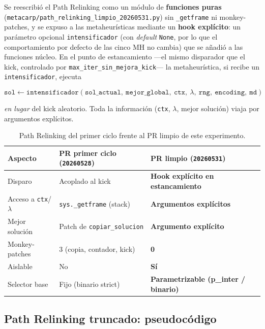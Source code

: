 Se reescribió el Path Relinking como un módulo de \textbf{funciones puras}
(\texttt{metacarp/path\_relinking\_limpio\_20260531.py}) sin
\texttt{\_getframe} ni monkey-patches, y se expuso a las metaheurísticas
mediante un \textbf{hook explícito}: un parámetro opcional
\texttt{intensificador} (con \emph{default} \texttt{None}, por lo que el
comportamiento por defecto de las cinco MH no cambia) que se añadió a las
funciones núcleo. En el punto de estancamiento ---el mismo disparador que el
kick, controlado por \texttt{max\_iter\_sin\_mejora\_kick}--- la
metaheurística, si recibe un \texttt{intensificador}, ejecuta

\[
\texttt{sol} \leftarrow \texttt{intensificador}(\texttt{sol\_actual},\ \texttt{mejor\_global},\ \texttt{ctx},\ \lambda,\ \texttt{rng},\ \texttt{encoding},\ \texttt{md})
\]

\emph{en lugar} del kick aleatorio. Toda la información (\texttt{ctx},
$\lambda$, mejor solución) viaja por argumentos explícitos.

\begin{table}[h]
\centering
\caption{Path Relinking del primer ciclo frente al PR limpio de este experimento.}
\label{tab:pr-limpio-vs-sucio}
\small
\begin{tabular}{lll}
\toprule
Aspecto & PR primer ciclo (\texttt{20260528}) & PR limpio (\texttt{20260531}) \\
\midrule
Disparo            & Acoplado al kick            & \textbf{Hook explícito en estancamiento} \\
Acceso a \texttt{ctx}/$\lambda$ & \texttt{sys.\_getframe} (stack) & \textbf{Argumentos explícitos} \\
Mejor solución     & Patch de \texttt{copiar\_solucion} & \textbf{Argumento explícito} \\
Monkey-patches     & 3 (copia, contador, kick)   & \textbf{0} \\
Aislable           & No                          & \textbf{Sí} \\
Selector base      & Fijo (binario strict)       & \textbf{Parametrizable (p\_inter / binario)} \\
\bottomrule
\end{tabular}
\end{table}

\subsection{\texorpdfstring{Path Relinking truncado: pseudocódigo}{Path Relinking truncado: pseudocodigo}}

